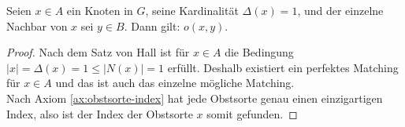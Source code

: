 \begin{lemma}\label{lem:grad-1}
Seien $x \in A$ ein Knoten in $G$, seine Kardinalität $\Delta(x) = 1$,
und der einzelne Nachbar von $x$ sei $y \in B$.
Dann gilt: $o(x, y)$. 
\end{lemma} 
\begin{proof}
Nach dem Satz von Hall ist für $x \in A$ die Bedingung $|x| = \Delta(x) = 1 \leqslant |N(x)| = 1$ erfüllt.
Deshalb existiert ein perfektes Matching für $x \in A$ und das ist auch das einzelne mögliche Matching.\\
Nach Axiom \ref{ax:obstsorte-index} hat jede Obstsorte genau einen einzigartigen Index, also ist der Index der Obstsorte
$x$ somit gefunden.
\end{proof}
